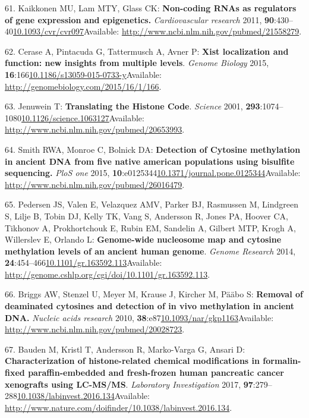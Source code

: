 \documentclass[
]{book}
\begin{document}
\leavevmode\hypertarget{ref-Kaikkonen2011}{}%
61. Kaikkonen MU, Lam MTY, Glass CK: \textbf{Non-coding RNAs as regulators of gene expression and epigenetics.} \emph{Cardiovascular research} 2011, \textbf{90}:430--40\href{https://doi.org/10.1093/cvr/cvr097}{10.1093/cvr/cvr097}Available: \url{http://www.ncbi.nlm.nih.gov/pubmed/21558279}.

\leavevmode\hypertarget{ref-Cerase2015}{}%
62. Cerase A, Pintacuda G, Tattermusch A, Avner P: \textbf{Xist localization and function: new insights from multiple levels}. \emph{Genome Biology} 2015, \textbf{16}:166\href{https://doi.org/10.1186/s13059-015-0733-y}{10.1186/s13059-015-0733-y}Available: \url{http://genomebiology.com/2015/16/1/166}.

\leavevmode\hypertarget{ref-Haluskova2010}{}%
63. Jenuwein T: \textbf{Translating the Histone Code}. \emph{Science} 2001, \textbf{293}:1074--1080\href{https://doi.org/10.1126/science.1063127}{10.1126/science.1063127}Available: \url{http://www.ncbi.nlm.nih.gov/pubmed/20653993}.

\leavevmode\hypertarget{ref-Smith2015}{}%
64. Smith RWA, Monroe C, Bolnick DA: \textbf{Detection of Cytosine methylation in ancient DNA from five native american populations using bisulfite sequencing.} \emph{PloS one} 2015, \textbf{10}:e0125344\href{https://doi.org/10.1371/journal.pone.0125344}{10.1371/journal.pone.0125344}Available: \url{http://www.ncbi.nlm.nih.gov/pubmed/26016479}.

\leavevmode\hypertarget{ref-Pedersen2014}{}%
65. Pedersen JS, Valen E, Velazquez AMV, Parker BJ, Rasmussen M, Lindgreen S, Lilje B, Tobin DJ, Kelly TK, Vang S, Andersson R, Jones PA, Hoover CA, Tikhonov A, Prokhortchouk E, Rubin EM, Sandelin A, Gilbert MTP, Krogh A, Willerslev E, Orlando L: \textbf{Genome-wide nucleosome map and cytosine methylation levels of an ancient human genome}. \emph{Genome Research} 2014, \textbf{24}:454--466\href{https://doi.org/10.1101/gr.163592.113}{10.1101/gr.163592.113}Available: \url{http://genome.cshlp.org/cgi/doi/10.1101/gr.163592.113}.

\leavevmode\hypertarget{ref-Briggs2010}{}%
66. Briggs AW, Stenzel U, Meyer M, Krause J, Kircher M, Pääbo S: \textbf{Removal of deaminated cytosines and detection of in vivo methylation in ancient DNA.} \emph{Nucleic acids research} 2010, \textbf{38}:e87\href{https://doi.org/10.1093/nar/gkp1163}{10.1093/nar/gkp1163}Available: \url{http://www.ncbi.nlm.nih.gov/pubmed/20028723}.

\leavevmode\hypertarget{ref-Bauden2017}{}%
67. Bauden M, Kristl T, Andersson R, Marko-Varga G, Ansari D: \textbf{Characterization of histone-related chemical modifications in formalin-fixed paraffin-embedded and fresh-frozen human pancreatic cancer xenografts using LC-MS/MS}. \emph{Laboratory Investigation} 2017, \textbf{97}:279--288\href{https://doi.org/10.1038/labinvest.2016.134}{10.1038/labinvest.2016.134}Available: \url{http://www.nature.com/doifinder/10.1038/labinvest.2016.134}.
\end{document}
